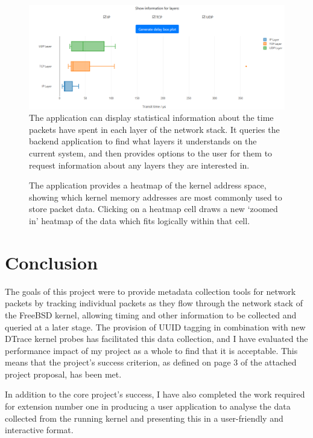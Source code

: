 \documentclass[a4paper,12pt,twoside,openright]{report}
\begin{document}
	\begin{figure}
		\centering
		\includegraphics[width=\linewidth]{include/ui-timing-box.png}
		\caption{The application can display statistical information about the time packets have spent in each layer of the network stack. It queries the backend application to find what layers it understands on the current system, and then provides options to the user for them to request information about any layers they are interested in.}
		\label{fig:ui-timing-box}
	\end{figure}

	\begin{figure}[b]
		\centering
		\caption{The application provides a heatmap of the kernel address space, showing which kernel memory addresses are most commonly used to store packet data. Clicking on a heatmap cell draws a new `zoomed in' heatmap of the data which fits logically within that cell.}
		\label{fig:ui-heatmap}
	\end{figure}
	
	\chapter{Conclusion}
	
	The goals of this project were to provide metadata collection tools for network packets by tracking individual packets as they flow through the network stack of the FreeBSD kernel, allowing timing and other information to be collected and queried at a later stage. The provision of UUID tagging in combination with new DTrace kernel probes has facilitated this data collection, and I have evaluated the performance impact of my project as a whole to find that it is acceptable. This means that the project's success criterion, as defined on page 3 of the attached project proposal, has been met.
	
	In addition to the core project's success, I have also completed the work required for extension number one in producing a user application to analyse the data collected from the running kernel and presenting this in a user-friendly and interactive format.
	
\end{document}
